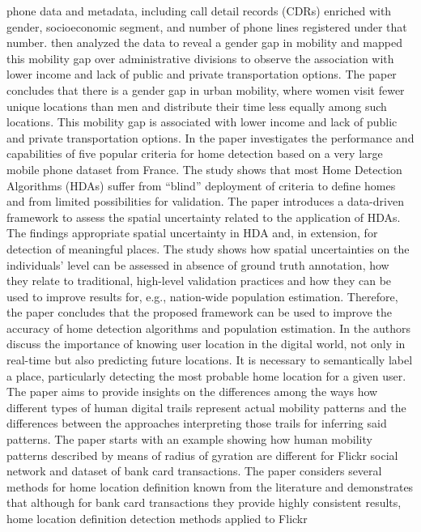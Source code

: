 \documentclass[]{elsarticle} %
\begin{document}
phone data and metadata, including call detail records (CDRs) enriched
with gender, socioeconomic segment, and number of phone lines registered
under that number. then analyzed the data to reveal a gender gap in
mobility and mapped this mobility gap over administrative divisions to
observe the association with lower income and lack of public and private
transportation options. The paper concludes that there is a gender gap
in urban mobility, where women visit fewer unique locations than men and
distribute their time less equally among such locations. This mobility
gap is associated with lower income and lack of public and private
transportation options. In \citep{vanhoof2018assessing} the paper
investigates the performance and capabilities of five popular criteria
for home detection based on a very large mobile phone dataset from
France. The study shows that most Home Detection Algorithms (HDAs)
suffer from ``blind'' deployment of criteria to define homes and from
limited possibilities for validation. The paper introduces a data-driven
framework to assess the spatial uncertainty related to the application
of HDAs. The findings appropriate spatial uncertainty in HDA and, in
extension, for detection of meaningful places. The study shows how
spatial uncertainties on the individuals' level can be assessed in
absence of ground truth annotation, how they relate to traditional,
high-level validation practices and how they can be used to improve
results for, e.g., nation-wide population estimation. Therefore, the
paper concludes that the proposed framework can be used to improve the
accuracy of home detection algorithms and population estimation. In
\citep{bojic2015choosing} the authors discuss the importance of knowing
user location in the digital world, not only in real-time but also
predicting future locations. It is necessary to semantically label a
place, particularly detecting the most probable home location for a
given user. The paper aims to provide insights on the differences among
the ways how different types of human digital trails represent actual
mobility patterns and the differences between the approaches
interpreting those trails for inferring said patterns. The paper starts
with an example showing how human mobility patterns described by means
of radius of gyration are different for Flickr social network and
dataset of bank card transactions. The paper considers several methods
for home location definition known from the literature and demonstrates
that although for bank card transactions they provide highly consistent
results, home location definition detection methods applied to Flickr
\end{document}
